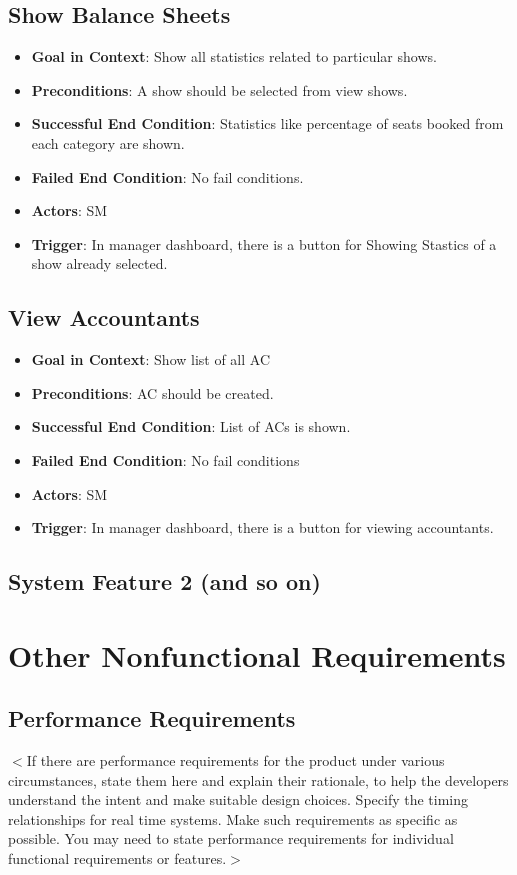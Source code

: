 \documentclass{scrreprt}
\begin{document}
\section{Show Balance Sheets}
\begin{itemize}
\item \textbf{Goal in Context}: Show all statistics related to particular shows.
\item \textbf{Preconditions}: A show should be selected from view shows.
\item \textbf{Successful End Condition}: Statistics like percentage of seats booked from each category are shown.
\item \textbf{Failed End Condition}: No fail conditions.
\item \textbf{Actors}: SM
\item \textbf{Trigger}: In manager dashboard, there is a button for Showing Stastics of a show already selected.
\end{itemize}


\section{View Accountants}
\begin{itemize}
\item \textbf{Goal in Context}: Show list of all AC
\item \textbf{Preconditions}: AC should be created.
\item \textbf{Successful End Condition}: List of ACs is shown.
\item \textbf{Failed End Condition}: No fail conditions
\item \textbf{Actors}: SM
\item \textbf{Trigger}: In manager dashboard, there is a button for viewing accountants.
\end{itemize}

\section{System Feature 2 (and so on)}


\chapter{Other Nonfunctional Requirements}

\section{Performance Requirements}
$<$If there are performance requirements for the product under various 
circumstances, state them here and explain their rationale, to help the 
developers understand the intent and make suitable design choices. Specify the 
timing relationships for real time systems. Make such requirements as specific 
as possible. You may need to state performance requirements for individual 
functional requirements or features.$>$
\end{document}
